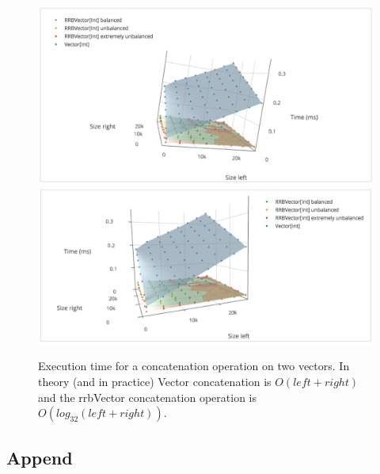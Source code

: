 \begin{figure}[h!]
  \centering
  \includegraphics[width=\textwidth]{Benchmarks/Concat.png}
  \includegraphics[width=\textwidth]{Benchmarks/Concat2.png}
  \label{ConcatBenchmarks}
  \caption{Execution time for a concatenation operation on two vectors. In theory (and in practice) Vector concatenation is $O(left + right)$ and the rrbVector concatenation operation is $O(log_{32}(left + right))$.}
\end{figure}

\subsection{Append}

